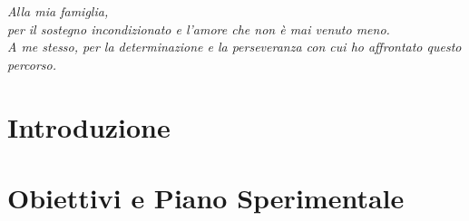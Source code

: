 \documentclass[oneside, 12pt]{report}
\begin{document}
\hypersetup{pageanchor=false}


\begin{titlepage}
    \vspace*{5cm}
    \begin{center}
        \emph{Alla mia famiglia, \\
        per il sostegno incondizionato e l'amore che non è mai venuto meno. \\
        A me stesso, per la determinazione e la perseveranza con cui ho affrontato questo percorso.}
    \end{center}
\end{titlepage}

\hypersetup{pageanchor=true}



\tableofcontents

\listoffigures

\listoftables

\printnoidxglossary[type=\acronymtype, nonumberlist, title={Elenco degli Acronimi}]

\chapter{Introduzione}
\label{chap:introduzione}


\chapter{Obiettivi e Piano Sperimentale}
\label{chap:obiettivi}
\label{chap:specifiche}


\end{document}
